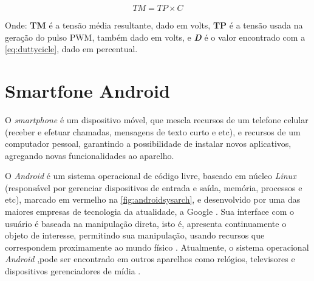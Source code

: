 \begin{equation}
{TM} = {TP} \times {C}
\label{eq:avervoltage}
\end{equation}

Onde: \textbf{TM} é a tensão média resultante, dado em volts, \textbf{TP} é a tensão usada na geração do pulso PWM, também dado em volts, e \textbf{\textit{D}} é o valor encontrado com a \autoref{eq:duttycicle}, dado em percentual.

\section{Smartfone Android}
\label{sec:android}

O \textit{smartphone} é um dispositivo móvel, que mescla recursos de um telefone celular (receber e efetuar chamadas, mensagens de texto curto e etc), e recursos de um computador pessoal, garantindo a possibilidade de instalar novos aplicativos, agregando novas funcionalidades ao aparelho.\par

O \textit{Android} é um sistema operacional de código livre, baseado em núcleo \textit{Linux} (responsável por gerenciar dispositivos de entrada e saída, memória, processos e etc), marcado em vermelho na \autoref{fig:androidsysarch}, e desenvolvido por uma das maiores empresas de tecnologia da atualidade, a Google . Sua interface com o usuário é baseada na manipulação direta, isto é, apresenta continuamente o objeto de interesse, permitindo sua manipulação, usando recursos que correspondem proximamente ao mundo físico . Atualmente, o sistema operacional \textit{Android} ,pode ser encontrado em outros aparelhos como relógios, televisores e dispositivos gerenciadores de mídia . \par

